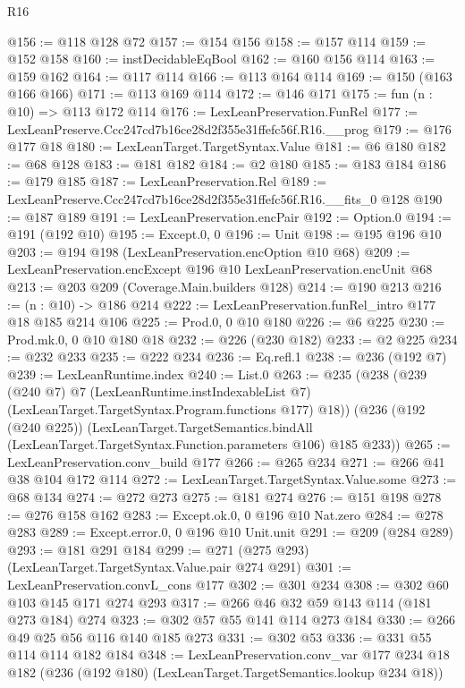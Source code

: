 \begin{lexlean}{R16}
\begin{coremodule}
@156 := @118 @128 @72
@157 := @154 @156
@158 := @157 @114
@159 := @152 @158
@160 := instDecidableEqBool
@162 := @160 @156 @114
@163 := @159 @162
@164 := @117 @114
@166 := @113 @164 @114
@169 := @150 (@163 @166 @166)
@171 := @113 @169 @114
@172 := @146 @171
@175 := fun (n : @10) => @113 @172 @114
@176 := LexLeanPreservation.FunRel
@177 := LexLeanPreserve.Ccc247cd7b16ce28d2f355e31ffefc56f.R16.__prog
@179 := @176 @177 @18
@180 := LexLeanTarget.TargetSyntax.Value
@181 := @6 @180
@182 := @68 @128
@183 := @181 @182
@184 := @2 @180
@185 := @183 @184
@186 := @179 @185
@187 := LexLeanPreservation.Rel
@189 := LexLeanPreserve.Ccc247cd7b16ce28d2f355e31ffefc56f.R16.__fits_0 @128
@190 := @187 @189
@191 := LexLeanPreservation.encPair
@192 := Option.{0}
@194 := @191 (@192 @10)
@195 := Except.{0, 0}
@196 := Unit
@198 := @195 @196 @10
@203 := @194 @198 (LexLeanPreservation.encOption @10 @68)
@209 := LexLeanPreservation.encExcept @196 @10 LexLeanPreservation.encUnit @68
@213 := @203 @209 (Coverage.Main.builders @128)
@214 := @190 @213
@216 := (n : @10) -> @186 @214
@222 := LexLeanPreservation.funRel_intro @177 @18 @185 @214 @106
@225 := Prod.{0, 0} @10 @180
@226 := @6 @225
@230 := Prod.mk.{0, 0} @10 @180 @18
@232 := @226 (@230 @182)
@233 := @2 @225
@234 := @232 @233
@235 := @222 @234
@236 := Eq.refl.{1}
@238 := @236 (@192 @7)
@239 := LexLeanRuntime.index
@240 := List.{0}
@263 := @235
    (@238
      (@239
        (@240 @7)
        @7
        (LexLeanRuntime.instIndexableList @7)
        (LexLeanTarget.TargetSyntax.Program.functions @177)
        @18))
    (@236
      (@192 (@240 @225))
      (LexLeanTarget.TargetSemantics.bindAll
        (LexLeanTarget.TargetSyntax.Function.parameters @106)
        @185
        @233))
@265 := LexLeanPreservation.conv_build @177
@266 := @265 @234
@271 := @266 @41 @38 @104 @172 @114
@272 := LexLeanTarget.TargetSyntax.Value.some
@273 := @68 @134
@274 := @272 @273
@275 := @181 @274
@276 := @151 @198
@278 := @276 @158 @162
@283 := Except.ok.{0, 0} @196 @10 Nat.zero
@284 := @278 @283
@289 := Except.error.{0, 0} @196 @10 Unit.unit
@291 := @209 (@284 @289)
@293 := @181 @291 @184
@299 := @271 (@275 @293) (LexLeanTarget.TargetSyntax.Value.pair @274 @291)
@301 := LexLeanPreservation.convL_cons @177
@302 := @301 @234
@308 := @302 @60 @103 @145 @171 @274 @293
@317 := @266 @46 @32 @59 @143 @114 (@181 @273 @184) @274
@323 := @302 @57 @55 @141 @114 @273 @184
@330 := @266 @49 @25 @56 @116 @140 @185 @273
@331 := @302 @53
@336 := @331 @55 @114 @114 @182 @184
@348 := LexLeanPreservation.conv_var
    @177
    @234
    @18
    @182
    (@236 (@192 @180) (LexLeanTarget.TargetSemantics.lookup @234 @18))

\end{coremodule}
\end{lexlean}
